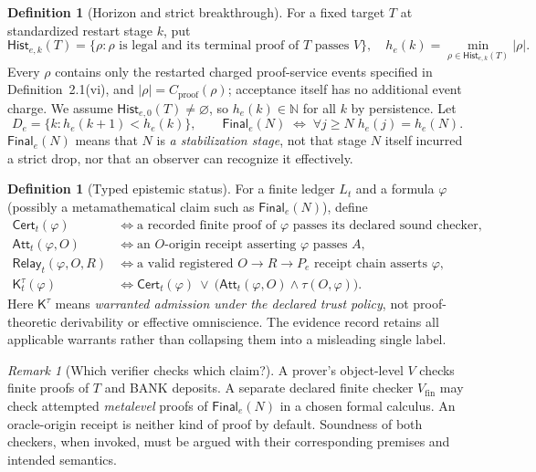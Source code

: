 \documentclass[11pt,letterpaper]{article}
\theoremstyle{definition}
\newtheorem{definition}[theorem]{Definition}
\theoremstyle{remark}
\newtheorem{remark}[theorem]{Remark}
\newcommand{\N}{\mathbb N}
\newcommand{\Fin}{\mathsf{Final}}
\newcommand{\Cert}{\mathsf{Cert}}
\newcommand{\Att}{\mathsf{Att}}
\newcommand{\Relay}{\mathsf{Relay}}
\newcommand{\Hist}{\mathsf{Hist}}
\newcommand{\Ktau}{\mathsf K^{\tau}}
\begin{document}
\begin{definition}[Horizon and strict breakthrough]
For a fixed target $T$ at standardized restart stage $k$, put
\[
\Hist_{e,k}(T)=\{\rho:\rho\text{ is legal and its terminal proof of }T\text{ passes }V\},
\quad h_e(k)=\min_{\rho\in\Hist_{e,k}(T)}|\rho|.
\]
Every $\rho$ contains only the restarted charged proof-service events specified in Definition~2.1(vi), and $|\rho|=C_{\mathrm{proof}}(\rho)$; acceptance itself has no additional event charge. We assume $\Hist_{e,0}(T)\ne\varnothing$, so $h_e(k)\in\N$ for all $k$ by persistence. Let
\[
D_e=\{k:h_e(k+1)<h_e(k)\},\qquad
\Fin_e(N)\;\Longleftrightarrow\;\forall j\ge N\;h_e(j)=h_e(N).
\]
$\Fin_e(N)$ means that $N$ is \emph{a stabilization stage}, not that stage $N$ itself incurred a strict drop, nor that an observer can recognize it effectively.
\end{definition}

\begin{definition}[Typed epistemic status]
For a finite ledger $L_t$ and a formula $\varphi$ (possibly a metamathematical claim such as $\Fin_e(N)$), define
\begin{align*}
\Cert_t(\varphi)&\iff\text{a recorded finite proof of $\varphi$ passes its declared sound checker},\\
\Att_t(\varphi,O)&\iff\text{an $O$-origin receipt asserting $\varphi$ passes $A$},\\
\Relay_t(\varphi,O,R)&\iff\text{a valid registered $O\to R\to P_e$ receipt chain asserts $\varphi$},\\
\Ktau_t(\varphi)&\iff\Cert_t(\varphi)\ \lor\ \bigl(\Att_t(\varphi,O)\land\tau(O,\varphi)\bigr).
\end{align*}
Here $\Ktau$ means \emph{warranted admission under the declared trust policy}, not proof-theoretic derivability or effective omniscience. The evidence record retains all applicable warrants rather than collapsing them into a misleading single label.
\end{definition}

\begin{remark}[Which verifier checks which claim?]
A prover's object-level $V$ checks finite proofs of $T$ and BANK deposits. A separate declared finite checker $V_{\mathrm{fin}}$ may check attempted \emph{metalevel} proofs of $\Fin_e(N)$ in a chosen formal calculus. An oracle-origin receipt is neither kind of proof by default. Soundness of both checkers, when invoked, must be argued with their corresponding premises and intended semantics.
\end{remark}
\end{document}
